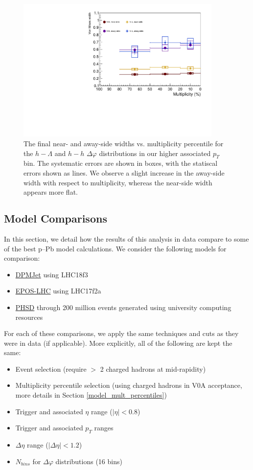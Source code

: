 \documentclass[ALICE,manyauthors]{ALICE_analysis_notes}
\begin{document}
\begin{figure}[ht]
\centering
\includegraphics[width=4in]{figures/von_mises_widths_highpt.pdf}
\caption{The final near- and away-side widths vs. multiplicity percentile for the $h-\Lambda$ and $h-h$ $\Delta\varphi$ distributions in our higher associated $p_{T}$ bin. The systematic errors are shown in boxes, with the statiscal errors shown as lines. We observe a slight increase in the away-side width with respect to multiplicity, whereas the near-side width appears more flat.}
\label{width_vs_mult_highpt}
\end{figure}
\clearpage

\subsection{Model Comparisons}
\label{model_comparisons}
In this section, we detail how the results of this analysis in data compare to some of the best p--Pb model calculations. We consider the following models for comparison:
\begin{itemize}
\item \href{https://arxiv.org/pdf/hep-ph/0012252.pdf}{DPMJet} using LHC18f3
\item \href{https://arxiv.org/pdf/1306.0121.pdf}{EPOS-LHC} using LHC17f2a
\item \href{https://arxiv.org/pdf/0808.0022.pdf}{PHSD} through 200 million events generated using university computing resources
\end{itemize}

For each of these comparisons, we apply the same techniques and cuts as they were in data (if applicable). More explicitly, all of the following are kept the same:
\begin{itemize}
\item Event selection (require $>$ 2 charged hadrons at mid-rapidity)
\item Multiplicity percentile selection (using charged hadrons in V0A acceptance, more details in Section \ref{model_mult_percentiles})
\item Trigger and associated $\eta$ range ($|\eta| < 0.8$)
\item Trigger and associated $p_{T}$ ranges
\item $\Delta\eta$ range ($|\Delta\eta| < 1.2$)
\item $N_{bins}$ for $\Delta\varphi$ distributions (16 bins)
\end{itemize}
\end{document}

